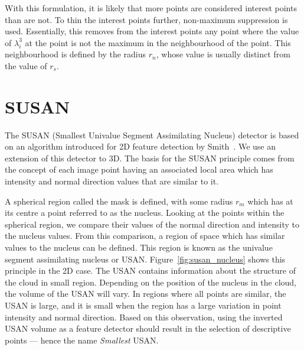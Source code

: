 \documentclass[11pt,a4paper]{kth-mag}
\begin{document}
With this formulation, it is likely that more points are considered interest
points than are not. To thin the interest points further, non-maximum
suppression is used. Essentially, this removes from the interest points any
point where the value of $\lambda^3_i$ at the point is not the maximum in the
neighbourhood of the point. This neighbourhood is defined by the radius $r_{n}$,
whose value is usually distinct from the value of $r_s$.
\section{SUSAN}
The SUSAN (Smallest Univalue Segment Assimilating Nucleus) detector is based on
an algorithm introduced for 2D feature detection by Smith~\cite{smith1997susan}.
We use an extension of this detector to 3D. The basis for the SUSAN principle
comes from the concept of each image point having an associated local area which
has intensity and normal direction values that are similar to it.

A spherical region called the mask is defined, with some radius $r_m$ which has
at its centre a point referred to as the nucleus. Looking at the points within
the spherical region, we compare their values of the normal direction and
intensity to the nucleus values. From this comparison, a region of space which
has similar values to the nucleus can be defined. This region is known as the
univalue segment assimilating nucleus or USAN. Figure~\ref{fig:susan_nucleus}
shows this principle in the 2D case. The USAN contains information about the
structure of the cloud in small region. Depending on the position of the nucleus
in the cloud, the volume of the USAN will vary. In regions where all points are
similar, the USAN is large, and it is small when the region has a large
variation in point intensity and normal direction. Based on this observation,
using the inverted USAN volume as a feature detector should result in the
selection of descriptive points --- hence the name \emph{Smallest} USAN.
\end{document}
